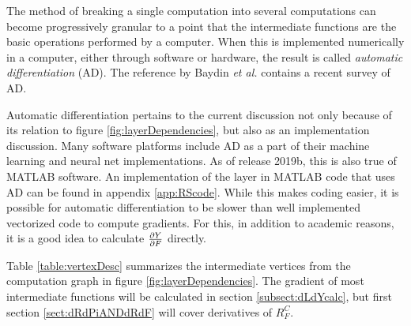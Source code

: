 The method of breaking a single computation into several computations can become progressively granular to a point that the intermediate functions are the basic operations performed by a computer. When this is implemented numerically in a computer, either through software or hardware, the result is called \textit{automatic differentiation} (AD).  The reference by Baydin \textit{et al.} \cite{baydin2017automatic} contains a recent survey of AD.  

Automatic differentiation pertains to the current discussion not only because of its relation to figure \ref{fig:layerDependencies}, but also as an implementation discussion. Many software platforms include AD as a part of their machine learning and neural net implementations. As of release 2019b, this is also true of MATLAB software.  An implementation of the \RS layer in MATLAB code  that uses AD can be found in appendix \ref{app:RScode}.  While this makes coding easier, it is possible for automatic differentiation to be slower than well implemented vectorized code to compute gradients.  For this, in addition to academic reasons, it is a good idea to calculate \( \pdv{Y}{F} \) directly.

Table \ref{table:vertexDesc} summarizes the intermediate vertices from the computation graph in figure \ref{fig:layerDependencies}.  The gradient of most intermediate functions will be calculated in section \ref{subsect:dLdYcalc}, but first section \ref{sect:dRdPiANDdRdF} will cover derivatives of \( R_F^C \).

